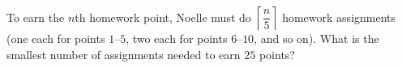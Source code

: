 To earn the $n$th homework point, Noelle must do $\left\lceil\dfrac {n}{5}\right\rceil$ homework assignments (one each for points $1$--$5$, two each for points $6$--$10$, and so on). What is the smallest number of assignments needed to earn $25$ points?
